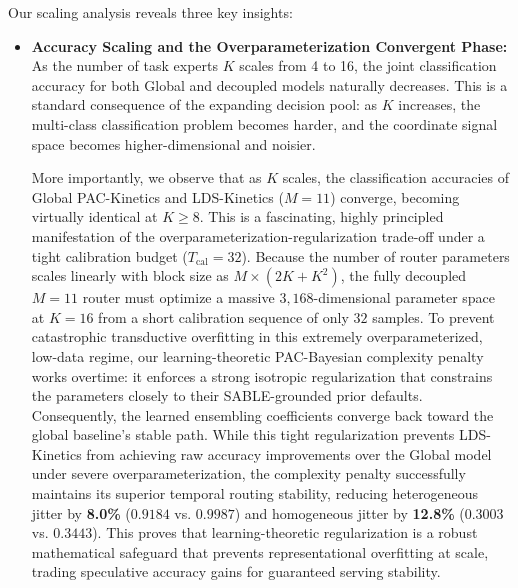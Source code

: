 Our scaling analysis reveals three key insights:
\begin{itemize}
    \item \textbf{Accuracy Scaling and the Overparameterization Convergent Phase:} As the number of task experts $K$ scales from 4 to 16, the joint classification accuracy for both Global and decoupled models naturally decreases. This is a standard consequence of the expanding decision pool: as $K$ increases, the multi-class classification problem becomes harder, and the coordinate signal space becomes higher-dimensional and noisier. 

    More importantly, we observe that as $K$ scales, the classification accuracies of Global PAC-Kinetics and LDS-Kinetics ($M=11$) converge, becoming virtually identical at $K \ge 8$. This is a fascinating, highly principled manifestation of the overparameterization-regularization trade-off under a tight calibration budget ($T_{\text{cal}}=32$). Because the number of router parameters scales linearly with block size as $M \times (2K + K^2)$, the fully decoupled $M=11$ router must optimize a massive $3,168$-dimensional parameter space at $K=16$ from a short calibration sequence of only $32$ samples. To prevent catastrophic transductive overfitting in this extremely overparameterized, low-data regime, our learning-theoretic PAC-Bayesian complexity penalty works overtime: it enforces a strong isotropic regularization that constrains the parameters closely to their SABLE-grounded prior defaults. Consequently, the learned ensembling coefficients converge back toward the global baseline's stable path. While this tight regularization prevents LDS-Kinetics from achieving raw accuracy improvements over the Global model under severe overparameterization, the complexity penalty successfully maintains its superior temporal routing stability, reducing heterogeneous jitter by \textbf{8.0\%} ($0.9184$ vs. $0.9987$) and homogeneous jitter by \textbf{12.8\%} ($0.3003$ vs. $0.3443$). This proves that learning-theoretic regularization is a robust mathematical safeguard that prevents representational overfitting at scale, trading speculative accuracy gains for guaranteed serving stability.


\end{itemize}
